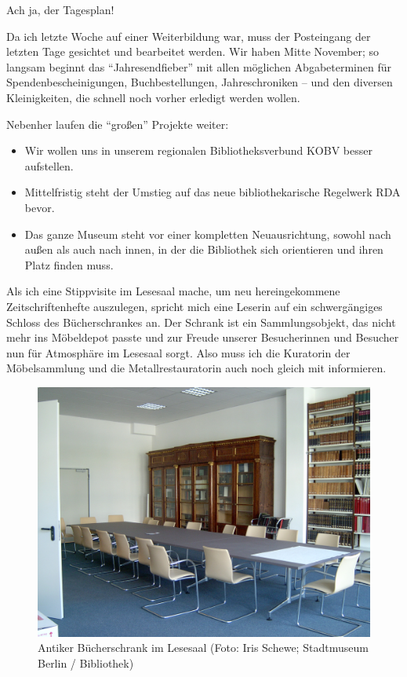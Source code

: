 \documentclass[a4paper,
fontsize=11pt,
oneside,
numbers=noperiodatend,
parskip=half-,
bibliography=totoc,
final
]{scrartcl}
\begin{document}
Ach ja, der Tagesplan!

Da ich letzte Woche auf einer Weiterbildung war, muss der Posteingang
der letzten Tage gesichtet und bearbeitet werden. Wir haben Mitte
November; so langsam beginnt das \enquote{Jahresendfieber} mit allen
möglichen Abgabeterminen für Spendenbescheinigungen, Buchbestellungen,
Jahreschroniken -- und den diversen Kleinigkeiten, die schnell noch
vorher erledigt werden wollen.

Nebenher laufen die \enquote{großen} Projekte weiter:

\begin{itemize}
\item
  Wir wollen uns in unserem regionalen Bibliotheksverbund KOBV besser
  aufstellen.
\item
  Mittelfristig steht der Umstieg auf das neue bibliothekarische
  Regelwerk RDA bevor.
\item
  Das ganze Museum steht vor einer kompletten Neuausrichtung, sowohl
  nach außen als auch nach innen, in der die Bibliothek sich orientieren
  und ihren Platz finden muss.
\end{itemize}

Als ich eine Stippvisite im Lesesaal mache, um neu hereingekommene
Zeitschriftenhefte auszulegen, spricht mich eine Leserin auf ein
schwergängiges Schloss des Bücherschrankes an. Der Schrank ist ein
Sammlungsobjekt, das nicht mehr ins Möbeldepot passte und zur Freude
unserer Besucherinnen und Besucher nun für Atmosphäre im Lesesaal sorgt.
Also muss ich die Kuratorin der Möbelsammlung und die
Metallrestauratorin auch noch gleich mit informieren.

\begin{figure}
\centering
\includegraphics{img/Schewe_2.JPG}
\caption{Antiker Bücherschrank im Lesesaal (Foto: Iris Schewe;
Stadtmuseum Berlin / Bibliothek)}
\end{figure}
\end{document}
